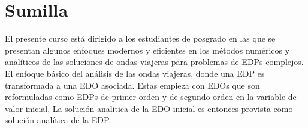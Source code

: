 \section{Sumilla}

El presente curso está dirigido a los estudiantes de posgrado en las que
se presentan algunos enfoques modernos y eficientes en los métodos
numéricos y analíticos de las soluciones de ondas viajeras para problemas de EDPs complejos.
El enfoque básico del análisis de las ondas viajeras, donde una EDP es transformada
a una EDO asociada. Estas empieza con EDOs que son reformuladas como EDPs de primer orden y de segundo
orden en la variable de valor inicial.
La solución analítica de la EDO inicial es entonces provista como solución analítica de la EDP.



